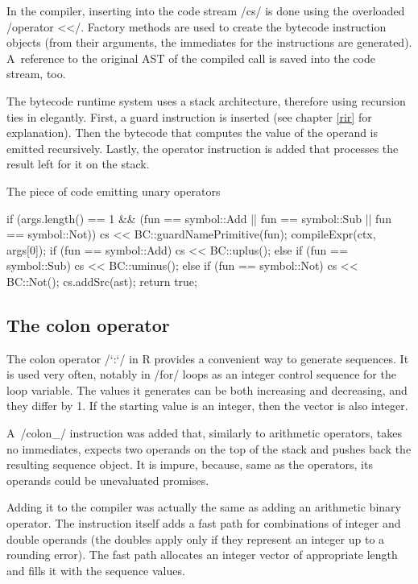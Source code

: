In the compiler, inserting into the code stream \cppinline/cs/ is done using the overloaded \cppinline/operator <</. Factory methods are used to create the bytecode instruction objects (from their arguments, the immediates for the instructions are generated). A~reference to the original AST of the compiled call is saved into the code stream, too.

The bytecode runtime system uses a stack architecture, therefore using recursion ties in elegantly. First, a guard instruction is inserted (see chapter \ref{rir} for explanation). Then the bytecode that computes the value of the operand is emitted recursively. Lastly, the operator instruction is added that processes the result left for it on the stack.

\begin{listing}[htbp]
  \caption{\label{lst:cmp-unary}The piece of code emitting unary operators}
  \begin{cppcode}
if (args.length() == 1 &&
    (fun == symbol::Add || fun == symbol::Sub ||
     fun == symbol::Not)) {
    cs << BC::guardNamePrimitive(fun);
    compileExpr(ctx, args[0]);
    if (fun == symbol::Add)
        cs << BC::uplus();
    else if (fun == symbol::Sub)
        cs << BC::uminus();
    else if (fun == symbol::Not)
        cs << BC::Not();
    cs.addSrc(ast);
    return true;
}
  \end{cppcode}
\end{listing}


\subsection{The colon operator}

The colon operator \rinline/`:`/ in R provides a convenient way to generate sequences. It is used very often, notably in \rinline/for/ loops as an integer control sequence for the loop variable. The values it generates can be both increasing and decreasing, and they differ by 1. If the starting value is an integer, then the vector is also integer.

A~\cinline/colon_/ instruction was added that, similarly to arithmetic operators, takes no immediates, expects two operands on the top of the stack and pushes back the resulting sequence object. It is impure, because, same as the operators, its operands could be unevaluated promises.

Adding it to the compiler was actually the same as adding an arithmetic binary operator. The instruction itself adds a fast path for combinations of integer and double operands (the doubles apply only if they represent an integer up to a rounding error). The fast path allocates an integer vector of appropriate length and fills it with the sequence values.

